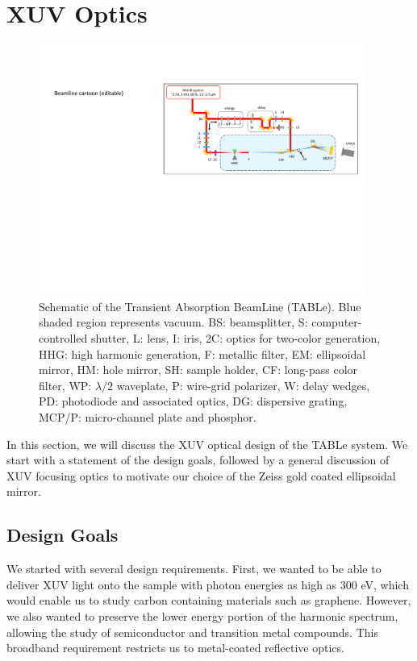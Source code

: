 \section{XUV Optics}
\label{sec:Interferometer_Design}

\begin{figure}
	\centering
	\includegraphics[width=0.95\textwidth]{figures/chap2/beamline_schematic.pdf}
	\caption{Schematic of the Transient Absorption BeamLine (TABLe). Blue shaded region represents vacuum. BS: beamsplitter, S: computer-controlled shutter, L: lens, I: iris, 2C: optics for two-color generation, HHG: high harmonic generation, F: metallic filter, EM: ellipsoidal mirror, HM: hole mirror, SH: sample holder, CF: long-pass color filter, WP: $\lambda/2$ waveplate, P: wire-grid polarizer, W: delay wedges, PD: photodiode and associated optics, DG: dispersive grating, MCP/P: micro-channel plate and phosphor.}
	\label{fig:beamline_schematic}
\end{figure}

In this section, we will discuss the XUV optical design of the TABLe system. We start with a statement of the design goals, followed by a general discussion of XUV focusing optics to motivate our choice of the Zeiss gold coated ellipsoidal mirror. 

\subsection{Design Goals}

We started with several design requirements. First, we wanted to be able to deliver XUV light onto the sample with photon energies as high as 300 eV, which would enable us to study carbon containing materials such as graphene. However, we also wanted to preserve the lower energy portion of the harmonic spectrum, allowing the study of semiconductor and transition metal compounds. This broadband requirement restricts us to metal-coated reflective optics.

